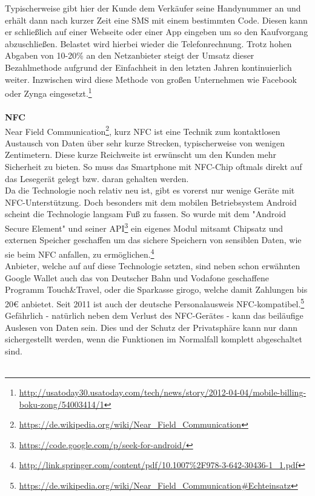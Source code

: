 Typischerweise gibt hier der Kunde dem Verkäufer seine Handynummer an und erhält dann nach kurzer Zeit eine SMS mit einem bestimmten Code. Diesen kann er schließlich auf einer Webseite oder einer App eingeben um so den Kaufvorgang abzuschließen. Belastet wird hierbei wieder die Telefonrechnung.
Trotz hohen Abgaben von 10-20\% an den Netzanbieter steigt der Umsatz dieser Bezahlmethode aufgrund der Einfachheit in den letzten Jahren kontinuierlich weiter. Inzwischen wird diese Methode von großen Unternehmen wie Facebook oder Zynga eingesetzt.\footnote{\url{http://usatoday30.usatoday.com/tech/news/story/2012-04-04/mobile-billing-boku-zong/54003414/1}}\\
\\
\textbf{NFC}\\
Near Field Communication\footnote{\url{https://de.wikipedia.org/wiki/Near_Field_Communication}}, kurz NFC ist eine Technik zum kontaktlosen Austausch von Daten über sehr kurze Strecken, typischerweise von wenigen Zentimetern. Diese kurze Reichweite ist erwünscht um den Kunden mehr Sicherheit zu bieten. So muss das Smartphone mit NFC-Chip oftmals direkt auf das Lesegerät gelegt bzw. daran gehalten werden. \\
Da die Technologie noch relativ neu ist, gibt es vorerst nur wenige Geräte mit NFC-Unterstützung. Doch besonders mit dem mobilen Betriebsystem Android scheint die Technologie langsam Fuß zu fassen. So wurde mit dem "Android Secure Element" und seiner API\footnote{\url{https://code.google.com/p/seek-for-android/}} ein eigenes Modul mitsamt Chipsatz und externen Speicher geschaffen um das sichere Speichern von sensiblen Daten, wie sie beim NFC anfallen, zu ermöglichen.\footnote{\url{http://link.springer.com/content/pdf/10.1007\%2F978-3-642-30436-1_1.pdf}}\\
Anbieter, welche auf auf diese Technologie setzten, sind neben schon erwähnten Google Wallet auch das von Deutscher Bahn und Vodafone geschaffene Programm Touch\&Travel, oder die Sparkasse girogo, welche damit Zahlungen bis 20\euro{} anbietet.
Seit 2011 ist auch der deutsche Personalausweis NFC-kompatibel.\footnote{\url{https://de.wikipedia.org/wiki/Near_Field_Communication\#Echteinsatz}}\\
Gefährlich - natürlich neben dem Verlust des NFC-Gerätes - kann das beiläufige Auslesen von Daten sein. Dies und der Schutz der Privatsphäre kann nur dann sichergestellt werden, wenn die Funktionen im Normalfall komplett abgeschaltet sind.\\
\\
